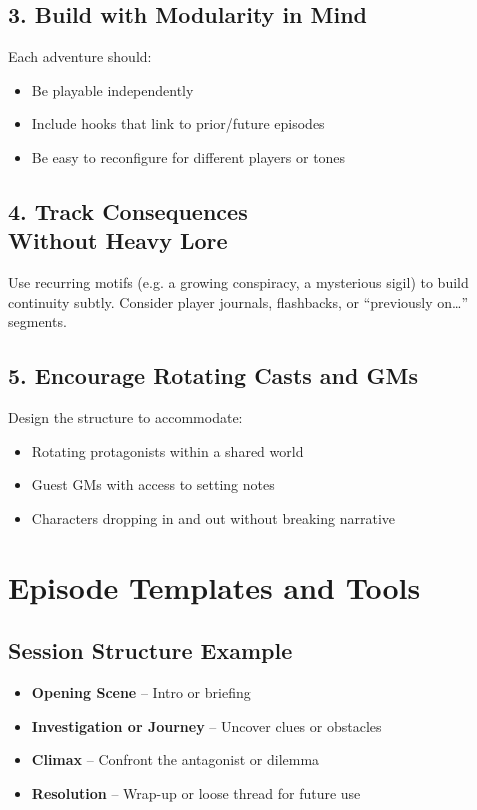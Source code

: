 \subsection*{3. Build with Modularity in Mind}
Each adventure should:
\begin{itemize}
    \item Be playable independently
    \item Include hooks that link to prior/future episodes
    \item Be easy to reconfigure for different players or tones
\end{itemize}

\subsection*{4. Track Consequences\\ Without Heavy Lore}
Use recurring motifs (e.g. a growing conspiracy, a mysterious sigil) to build continuity subtly. Consider player journals, flashbacks, or “previously on…” segments.

\subsection*{5. Encourage Rotating Casts and GMs}
Design the structure to accommodate:
\begin{itemize}
    \item Rotating protagonists within a shared world
    \item Guest GMs with access to setting notes
    \item Characters dropping in and out without breaking narrative
\end{itemize}

\section{Episode Templates and Tools}

\subsection*{Session Structure Example}
\begin{itemize}
    \item \textbf{Opening Scene} – Intro or briefing
    \item \textbf{Investigation or Journey} – Uncover clues or obstacles
    \item \textbf{Climax} – Confront the antagonist or dilemma
    \item \textbf{Resolution} – Wrap-up or loose thread for future use
\end{itemize}

